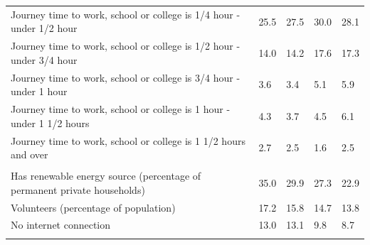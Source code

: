 \documentclass{article}
\begin{document}
\begin{table}[h]
\begin{tabular}{KTTTT}
Journey time to work, school or college is 1/4 hour - under 1/2 hour & 25.5& 27.5& 30.0& 28.1\\
Journey time to work, school or college is 1/2 hour - under 3/4 hour & 14.0& 14.2& 17.6& 17.3\\
Journey time to work, school or college is 3/4 hour - under 1 hour & 3.6& 3.4& 5.1& 5.9\\
Journey time to work, school or college is 1 hour - under 1 1/2 hours & 4.3& 3.7& 4.5& 6.1\\
Journey time to work, school or college is 1 1/2 hours and over & 2.7& 2.5& 1.6& 2.5\\
\hline
    \\ 
    \hline
Has renewable energy source (percentage of permanent private households) & 35.0& 29.9& 27.3& 22.9\\
    \hline
Volunteers (percentage of population) & 17.2& 15.8& 14.7& 13.8\\
    \hline
No internet connection& 13.0& 13.1&  9.8&  8.7\\
\hline
\end{tabular}
\end{table}
\end{document}
